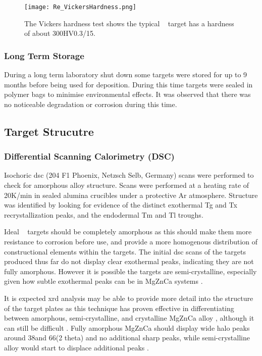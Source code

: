 \documentclass[a4paper,12pt,oneside]{report}%
\begin{document}
\begin{figure}[htbp]
	\centering
	\texttt{[image: Re\_VickersHardness.png]}
	\caption{The Vickers hardness test shows the typical \MgZnCa~ target has a hardness of about 300HV0.3/15.}
	\label{fig:TargetHV}
\end{figure}

\subsubsection{Long Term Storage}
During a long term laboratory shut down some targets were stored for up to 9 months before being used for deposition. During this time targets were sealed in polymer bags to minimise environmental effects. It was observed that there was no noticeable degradation or corrosion during this time.  

\subsection{Target Strucutre} 
\subsubsection{Differential Scanning Calorimetry (DSC)}
Isochoric \gls{dsc} (204 F1 Phoenix, Netzsch Selb, Germany) scans were performed to check for amorphous alloy structure. Scans were performed at a heating rate of 20K/min in sealed alumina crucibles under a protective Ar atmosphere. Structure was identified by looking for evidence of the distinct exothermal \gls{Tg} and \gls{Tx} recrystallization peaks, and the endodermal \gls{Tm} and \gls{Tl} troughs.

Ideal \MgZnCa~ targets should be completely amorphous as this should make them more resistance to corrosion before use, and provide a more homogenous distribution of constructional elements within the targets. The initial \gls{dsc} scans of the targets produced thus far do not display clear exothermal peaks, indicating they are not fully amorphous. However it is possible the targets are semi-crystalline, especially given how subtle exothermal peaks can be in MgZnCa systems \cite{Gu2010}. 

It is expected \gls{xrd} analysis may be able to provide more detail into the structure of the target plates as this technique has proven effective in differentiating between amorphous, semi-crystalline, and crystalline MgZnCa alloy \cite{Schluter2012, Wang2012}, although it can still be difficult \cite{Zhou2013}. Fully amorphous MgZnCa should display wide halo peaks around 38\degree and 66\degree (2 theta) and no additional sharp peaks, while semi-crystalline alloy would start to displace additional peaks \cite{Cao2013b, Gu2005, Wang2012, Gu2010, Cao2012}. 
\end{document}
